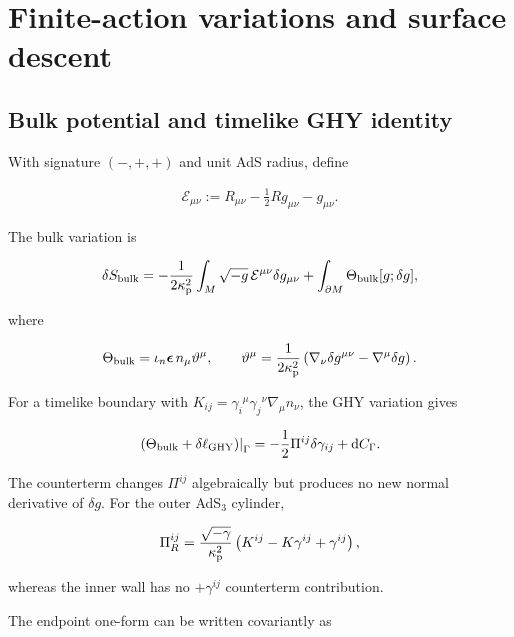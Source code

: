 \section{Finite-action variations and surface descent}\label{app:finite-action-details}

\subsection{Bulk potential and timelike GHY identity}

With signature $(-,+,+)$ and unit AdS radius, define

\begin{align}
\mathcal E_{\mu\nu}
:=R_{\mu\nu}-\frac12Rg_{\mu\nu}-g_{\mu\nu}.
\end{align}

The bulk variation is

\begin{align}
\delta S_{\rm bulk}
=-\frac1{2\kappa_{\rm p}^{2}}
\int_M\sqrt{-g}\,\mathcal E^{\mu\nu}\delta g_{\mu\nu}
+\int_{\partial M}\Theta_{\rm bulk}[g;\delta g],
\end{align}

where

\begin{align}
\Theta_{\rm bulk}
=\iota_n\boldsymbol\epsilon\,
n_\mu\vartheta^\mu,
\qquad
\vartheta^\mu
=\frac1{2\kappa_{\rm p}^{2}}
\left(\nabla_\nu\delta g^{\mu\nu}-\nabla^\mu\delta g\right).
\end{align}

For a timelike boundary with $K_{ij}=\gamma_i{}^\mu\gamma_j{}^\nu\nabla_\mu n_\nu$, the GHY variation gives

\begin{align}
\left.(\Theta_{\rm bulk}+\delta\ell_{\rm GHY})\right|_\Gamma
=-\frac12\Pi^{ij}\delta\gamma_{ij}+\mathrm dC_\Gamma .
\end{align}

The counterterm changes $\Pi^{ij}$ algebraically but produces no new normal derivative of $\delta g$. For the outer AdS$_3$ cylinder,

\begin{align}
\Pi^{ij}_{R}
=\frac{\sqrt{-\gamma}}{\kappa_{\rm p}^{2}}
\left(K^{ij}-K\gamma^{ij}+\gamma^{ij}\right),
\end{align}

whereas the inner wall has no $+\gamma^{ij}$ counterterm contribution.

The endpoint one-form can be written covariantly as

